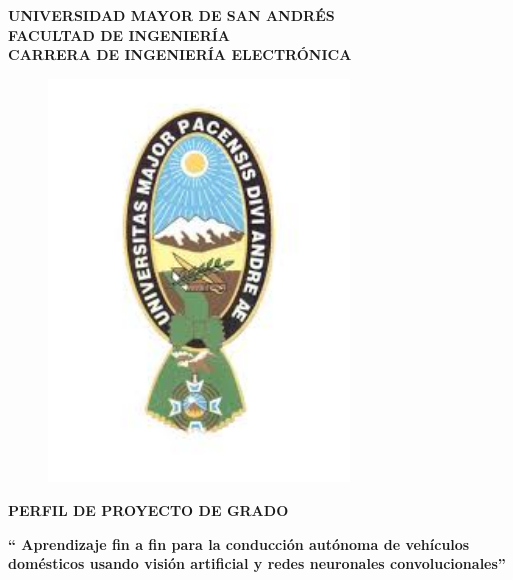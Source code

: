 \documentclass[12pt,letterpaper]{article}
\begin{document}
\marginsize{2.5cm}{2cm}{2cm}{2cm} 



\begin{titlepage}
\begin{center}
\vspace*{-0.5in}
\begin{large}
\textbf{UNIVERSIDAD MAYOR DE SAN ANDRÉS}\\
\vspace*{0.15in}
\textbf{FACULTAD DE INGENIERÍA}\\
\vspace*{0.15in}
\textbf{CARRERA DE INGENIERÍA ELECTRÓNICA}\\
\vspace*{0.1in}
\end{large}
\begin{figure}[htb]
\begin{center}
\includegraphics[width=8cm]{umsa.jpg}
\end{center}
\end{figure}
\begin{Large}
\textbf{PERFIL DE PROYECTO DE GRADO} 
\end{Large}
\vspace*{0.4in}

\begin{normalsize}
\textbf{`` Aprendizaje fin a fin para la conducción autónoma de vehículos domésticos usando visión artificial y redes neuronales convolucionales''} \\
\end{normalsize}




\end{center}
\end{titlepage}
\end{document}
